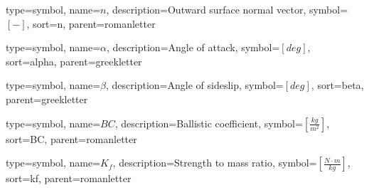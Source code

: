 {
	type=symbol, %
	name={\ensuremath{n}}, %
	description={Outward surface normal vector}, %
	symbol={$\left[- \right]$}, %
	sort=n, %
	parent=romanletter %
}

{
	type=symbol, %
	name={\ensuremath{\alpha}}, %
	description={Angle of attack}, %
	symbol={$\left[deg \right]$}, %
	sort=alpha, %
	parent=greekletter %
}

{
	type=symbol, %
	name={\ensuremath{\beta}}, %
	description={Angle of sideslip}, %
	symbol={$\left[deg \right]$}, %
	sort=beta, %
	parent=greekletter %
}

{
type=symbol, %
name={\ensuremath{BC}}, %
description={Ballistic coefficient}, %
symbol={$\left[\frac{kg}{m^2} \right]$}, %
sort=BC, %
parent=romanletter %
}

{
type=symbol, %
name={\ensuremath{K_f}}, %
description={Strength to mass ratio}, %
symbol={$\left[\frac{N \cdot m}{kg} \right]$}, %
sort=kf, %
parent=romanletter %
}

